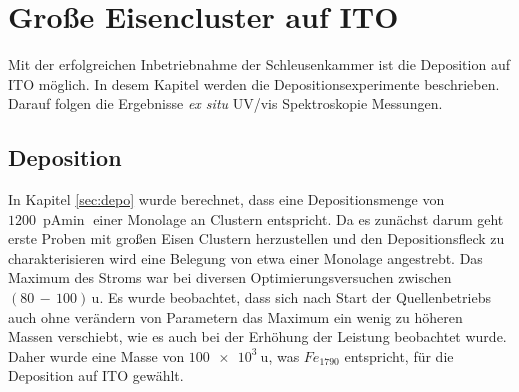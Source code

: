 \chapter{Große Eisencluster auf ITO}
Mit der erfolgreichen Inbetriebnahme der Schleusenkammer ist die Deposition auf ITO möglich. In desem Kapitel werden die Depositionsexperimente beschrieben.
Darauf folgen die Ergebnisse \textit{ex situ} UV/vis Spektroskopie Messungen. 


\section{Deposition}
In Kapitel \ref{sec:depo} wurde berechnet, dass eine Depositionsmenge von $\SI{1200}{\pA\min}$ einer Monolage an Clustern entspricht.
Da es zunächst darum geht erste Proben mit großen Eisen Clustern herzustellen und den Depositionsfleck zu charakterisieren wird eine Belegung von etwa einer Monolage angestrebt. 
Das Maximum des Stroms war bei diversen Optimierungsversuchen zwischen $(80\,-\,100)\,\text{u}$.
Es wurde beobachtet, dass sich nach Start der Quellenbetriebs auch ohne verändern von Parametern das Maximum ein wenig zu höheren Massen verschiebt, wie es auch bei der Erhöhung der Leistung beobachtet wurde.
Daher wurde eine Masse von $\SI{100e3}{\amu}$, was $Fe_{1790}$ entspricht, für die Deposition auf ITO gewählt.\\

